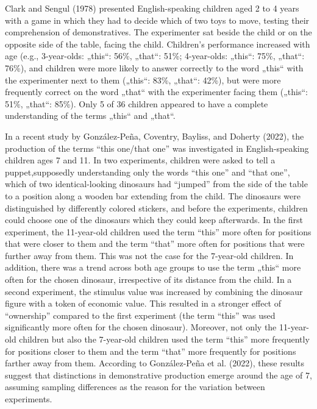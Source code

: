 \documentclass[
  man,floatsintext]{apa6}
\begin{document}
Clark and Sengul (1978) presented English-speaking children aged 2 to 4 years with a game in which they had to decide which of two toys to move, testing their comprehension of demonstratives. The experimenter sat beside the child or on the opposite side of the table, facing the child. Children's performance increased with age (e.g., 3-year-olds: „this``: 56\%, „that``: 51\%; 4-year-olds: „this``: 75\%, „that``: 76\%), and children were more likely to answer correctly to the word „this`` with the experimenter next to them („this``: 83\%, „that``: 42\%), but were more frequently correct on the word „that`` with the experimenter facing them („this``: 51\%, „that``: 85\%). Only 5 of 36 children appeared to have a complete understanding of the terms „this`` and „that``.

In a recent study by González-Peña, Coventry, Bayliss, and Doherty (2022), the production of the terms ``this one/that one'' was investigated in English-speaking children ages 7 and 11. In two experiments, children were asked to tell a puppet,supposedly understanding only the words ``this one'' and ``that one'', which of two identical-looking dinosaurs had ``jumped'' from the side of the table to a position along a wooden bar extending from the child. The dinosaurs were distinguished by differently colored stickers, and before the experiments, children could choose one of the dinosaurs which they could keep afterwards. In the first experiment, the 11-year-old children used the term ``this'' more often for positions that were closer to them and the term ``that'' more often for positions that were further away from them. This was not the case for the 7-year-old children. In addition, there was a trend across both age groups to use the term „this`` more often for the chosen dinosaur, irrespective of its distance from the child. In a second experiment, the stimulus value was increased by combining the dinosaur figure with a token of economic value. This resulted in a stronger effect of ``ownership'' compared to the first experiment (the term ``this'' was used significantly more often for the chosen dinosaur). Moreover, not only the 11-year-old children but also the 7-year-old children used the term ``this'' more frequently for positions closer to them and the term ``that'' more frequently for positions farther away from them. According to González-Peña et al. (2022), these results suggest that distinctions in demonstrative production emerge around the age of 7, assuming sampling differences as the reason for the variation between experiments.
\end{document}
